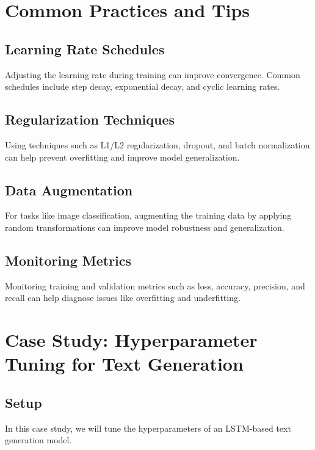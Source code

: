 \section{Common Practices and Tips}

\subsection{Learning Rate Schedules}
Adjusting the learning rate during training can improve convergence. Common schedules include step decay, exponential decay, and cyclic learning rates.

\subsection{Regularization Techniques}
Using techniques such as L1/L2 regularization, dropout, and batch normalization can help prevent overfitting and improve model generalization.

\subsection{Data Augmentation}
For tasks like image classification, augmenting the training data by applying random transformations can improve model robustness and generalization.

\subsection{Monitoring Metrics}
Monitoring training and validation metrics such as loss, accuracy, precision, and recall can help diagnose issues like overfitting and underfitting.

\section{Case Study: Hyperparameter Tuning for Text Generation}

\subsection{Setup}
In this case study, we will tune the hyperparameters of an LSTM-based text generation model.

